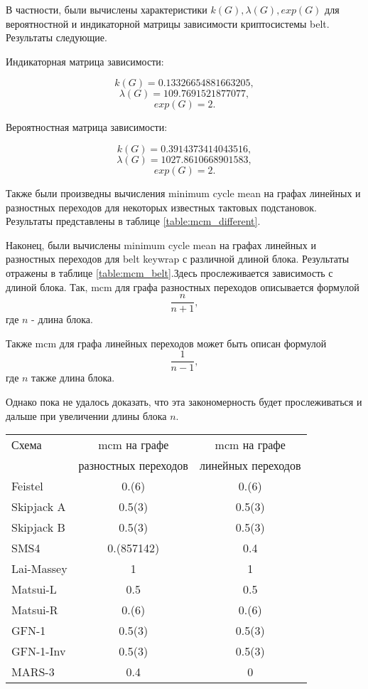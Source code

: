 \documentclass[a4paper,12pt]{report}
\makeatletter
\theoremstyle{plain} %
\theoremstyle{definition}
\theoremstyle{remark}
\renewenvironment{table}{%
\let\@makecaption\@maketablecaption
\@float{table}}%
{%
\addtocontents{lot}{ {\vskip 0.4em} }%
\end@float%
}
\newlength\abovetablecaptionskip
\newlength\belowtablecaptionskip
\newlength\tableparindent
\newcommand{\@maketablecaption}[2]{
  \vskip\abovetablecaptionskip
  \hskip\tableparindent \large #1~---\ \large #2\par
  \vskip\belowtablecaptionskip
}
\makeatother
\begin{document}
\begin{large}
В частности, были вычислены характеристики $k(G), \lambda(G), exp(G)$ для вероятностной и индикаторной матрицы зависимости криптосистемы belt. Результаты следующие.

Индикаторная матрица зависимости:

$$k(G) = 0.13326654881663205,$$
$$\lambda(G) = 109.7691521877077,$$
$$exp(G) = 2.$$

Вероятностная матрица зависимости:

$$k(G) = 0.3914373414043516,$$
$$\lambda(G) = 1027.8610668901583,$$
$$exp(G) = 2.$$

Также были произведны вычисления minimum cycle mean на графах линейных и разностных переходов для некоторых известных тактовых подстановок. Результаты представлены в таблице \ref{table:mcm_different}.

Наконец, были вычислены minimum cycle mean на графах линейных и разностных переходов для belt keywrap с различной длиной блока. Результаты отражены в таблице \ref{table:mcm_belt}.Здесь прослеживается зависимость с длиной блока. Так, mcm для графа разностных переходов описывается формулой $$\frac{n}{n+1},$$ где $n$ - длина блока. 

Также mcm для графа линейных переходов может быть описан формулой $$\frac{1}{n-1},$$ где $n$ также длина блока.

 Однако пока не удалось доказать, что эта закономерность будет прослеживаться и дальше при увеличении длины блока $n$.

\begin{table}
\caption{Результаты вычисления minimum cycle mean на графах линейных и разностных переходов различных тактовых подстановок}
\label{table:mcm_different}
\begin{center}
\begin{tabular}{ l | c | c }
  \hline			
  Схема & mcm на графе & mcm на графе \\
   & разностных переходов & линейных переходов \\
\hline
  Feistel & 0.(6) & 0.(6) \\
  Skipjack A & 0.5(3) & 0.5(3) \\
  Skipjack B & 0.5(3) & 0.5(3) \\
  SMS4 & 0.(857142) & 0.4 \\
  Lai-Massey & 1& 1 \\
  Matsui-L & 0.5 & 0.5 \\
  Matsui-R & 0.(6) & 0.(6) \\
  GFN-1 & 0.5(3) & 0.5(3) \\
  GFN-1-Inv & 0.5(3) & 0.5(3)  \\
  MARS-3 & 0.4 & 0 \\
  \hline  
\end{tabular}
\end{center}
\end{table}


\end{large}
\end{document}
